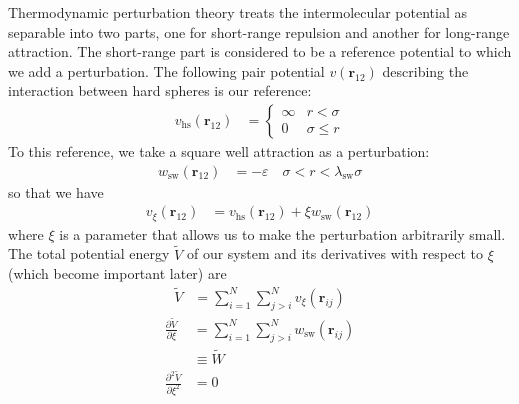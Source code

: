 \documentclass[letterpaper,twocolumn,amsmath,amssymb,prb]{revtex4-1}
\newcommand{\lambdaSW}{\ensuremath{\lambda_\text{sw}}}
\newcommand{\III}{\ensuremath{\textbf{r}_{12}}} %
\newcommand{\Vtilde}{\ensuremath{\widetilde{V}}}
\newcommand{\Wtilde}{\ensuremath{\widetilde{W}}}
\begin{document}
Thermodynamic perturbation theory treats the intermolecular potential
as separable into two parts, one for short-range repulsion and another
for long-range attraction. The short-range part is considered to be a
reference potential to which we add a perturbation. The following pair
potential $v(\III)$ describing the interaction between hard spheres is
our reference:
\begin{align}
  v_\text{hs}(\III) &=
    \begin{cases}
      \infty & r < \sigma \\
      0 & \sigma \leq r
    \end{cases}
\end{align}
To this reference, we take a square well attraction as a perturbation:
\begin{align}
  w_\text{sw}(\III) &= - \varepsilon \quad \sigma < r < \lambdaSW\sigma
\end{align}
so that we have
\begin{align}
  v_\xi(\III) &= v_\text{hs}(\III) + \xi w_\text{sw}(\III) \label{eqn:small-perturbation}
\end{align}
where $\xi$ is a parameter that allows us to make the perturbation arbitrarily small.
The total potential energy $\Vtilde$ of our system and its derivatives with
respect to $\xi$ (which become important later) are
\begin{align}
  \Vtilde &= \sum_{i=1}^N\sum_{j>i}^N v_\xi(\mathbf{r}_{ij})
\end{align}
\begin{align}
  \frac{\partial \Vtilde}{\partial\xi} &= \sum_{i=1}^N\sum_{j>i}^N w_\text{sw}(\mathbf{r}_{ij}) \nonumber \\
  &\equiv \Wtilde \\
  \frac{\partial^2 \Vtilde}{\partial\xi^2} &= 0
\end{align}
\end{document}
